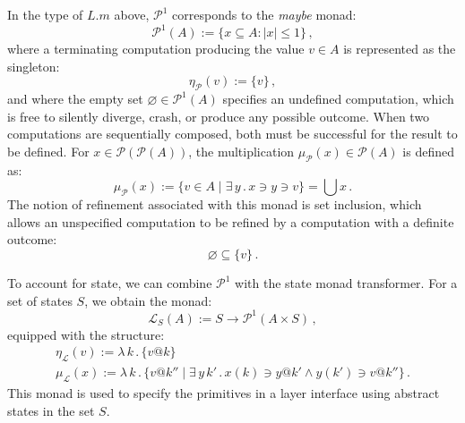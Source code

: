 \documentclass[11pt,oneside,draft]{book}
\theoremstyle{definition}
\begin{document}
In the type of $L.m$ above,
$\mathcal{P}^1$ corresponds to the \emph{maybe} monad:
\[
  \mathcal{P}^1(A) := \{ x \subseteq A : |x| \le 1 \} \,,
\]
where a terminating computation producing
the value $v \in A$ is represented as the singleton:
\[
  \eta_\mathcal{P}(v) := \{ v \} \,,
\]
and where the empty set $\varnothing \in \mathcal{P}^1(A)$
specifies an undefined computation,
which is free to silently diverge, crash, or
produce any possible outcome.
When two computations are sequentially composed,
both must be successful for the result to be defined.
For $x \in \mathcal{P}(\mathcal{P}(A))$,
the multiplication $\mu_\mathcal{P}(x) \in \mathcal{P}(A)$
is defined as:
\[
  \mu_\mathcal{P}(x) :=
    \{ v \in A \mid \exists \, y \,.\, x \ni y \ni v \} =
    \bigcup x
  \,.
\]
The notion of refinement associated with this monad is set inclusion,
which allows an unspecified computation to be refined by
a computation with a definite outcome:
\[
  \varnothing \subseteq \{ v \} \,.
\]

To account for state,
we can combine $\mathcal{P}^1$ with the state monad transformer.
For a set of states $S$,
we obtain the monad:
\[
  \mathcal{L}_S(A) :=
    S \rightarrow \mathcal{P}^1({A} \times S) \,,
\]
equipped with the structure:
\begin{gather*}
  \eta_\mathcal{L}(v) :=
    \lambda \, k \,.\, \{ v@k \} \\
  \mu_\mathcal{L}(x) :=
    \lambda \, k \,.\, \{ v@k'' \mid
      \exists \, y \, k' \,.\, x(k) \ni y@k' \wedge y(k') \ni v@k'' \}
  \,.
\end{gather*}
This monad is used to specify the primitives
in a layer interface using abstract states in the set $S$.
\end{document}
